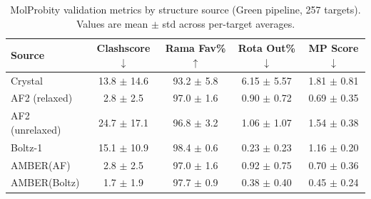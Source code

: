 \begin{table}[htbp]
\centering
\caption{MolProbity validation metrics by structure source (Green pipeline, 257 targets). Values are mean $\pm$ std across per-target averages.}
\label{tab:molprobity-green}
\begin{tabular}{lcccc}
\toprule
Source & Clashscore$\downarrow$ & Rama Fav\%$\uparrow$ & Rota Out\%$\downarrow$ & MP Score$\downarrow$ \\
\midrule
  Crystal & 13.8 $\pm$ 14.6 & 93.2 $\pm$ 5.8 & 6.15 $\pm$ 5.57 & 1.81 $\pm$ 0.81 \\
  \midrule
  AF2 (relaxed) & 2.8 $\pm$ 2.5 & 97.0 $\pm$ 1.6 & 0.90 $\pm$ 0.72 & 0.69 $\pm$ 0.35 \\
  AF2 (unrelaxed) & 24.7 $\pm$ 17.1 & 96.8 $\pm$ 3.2 & 1.06 $\pm$ 1.07 & 1.54 $\pm$ 0.38 \\
  Boltz-1 & 15.1 $\pm$ 10.9 & 98.4 $\pm$ 0.6 & 0.23 $\pm$ 0.23 & 1.16 $\pm$ 0.20 \\
  AMBER(AF) & 2.8 $\pm$ 2.5 & 97.0 $\pm$ 1.6 & 0.92 $\pm$ 0.75 & 0.70 $\pm$ 0.36 \\
  AMBER(Boltz) & 1.7 $\pm$ 1.9 & 97.7 $\pm$ 0.9 & 0.38 $\pm$ 0.40 & 0.45 $\pm$ 0.24 \\
\bottomrule
\end{tabular}
\end{table}